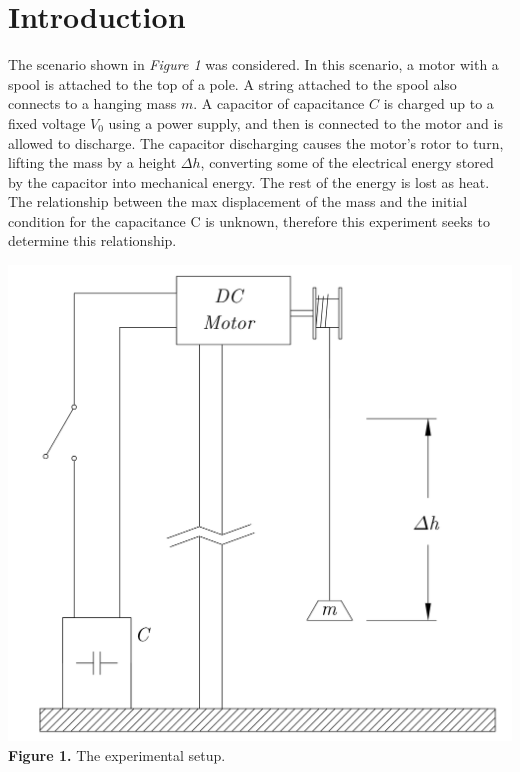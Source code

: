 \documentclass[12pt,letterpaper]{article}
\begin{document}
\section{Introduction}
The scenario shown in \textit{Figure 1} was considered. In this scenario, a motor with a spool is attached to the top of a pole. A string attached to the spool also connects to a hanging mass $m$. A capacitor of capacitance $C$ is charged up to a fixed voltage $V_0$ using a power supply, and then is connected to the motor and is allowed to discharge. The capacitor discharging causes the motor's rotor to turn, lifting the mass by a height $\Delta h$, converting some of the electrical energy stored by the capacitor into mechanical energy. The rest of the energy is lost as heat. The relationship between the max displacement of the mass and the initial condition for the capacitance C is unknown, therefore this experiment seeks to determine this relationship.
\newline
\begin{center}
\includegraphics[scale=0.17]{physics_2_lab_2.png}
\\\textbf{Figure 1.} The experimental setup.
\end{center}%
\pagebreak
\end{document}
